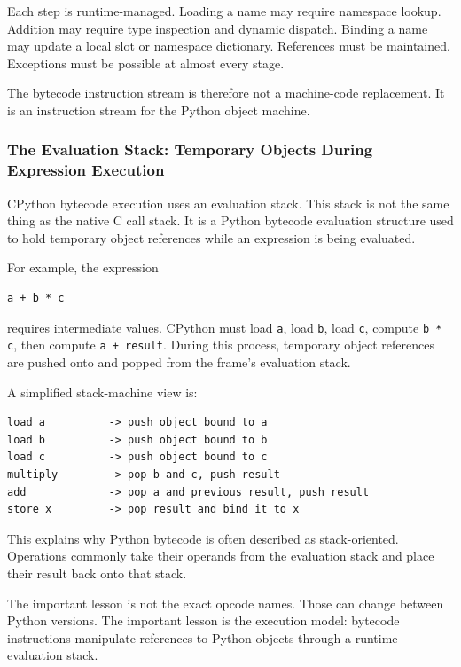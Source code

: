 Each step is runtime-managed. Loading a name may require namespace lookup. Addition may require type inspection and dynamic dispatch. Binding a name may update a local slot or namespace dictionary. References must be maintained. Exceptions must be possible at almost every stage.

The bytecode instruction stream is therefore not a machine-code replacement. It is an instruction stream for the Python object machine.

\subsubsection{The Evaluation Stack: Temporary Objects During Expression Execution}

CPython bytecode execution uses an evaluation stack. This stack is not the same thing as the native C call stack. It is a Python bytecode evaluation structure used to hold temporary object references while an expression is being evaluated.

For example, the expression

\begin{verbatim}
a + b * c
\end{verbatim}

requires intermediate values. CPython must load \texttt{a}, load \texttt{b}, load \texttt{c}, compute \texttt{b * c}, then compute \texttt{a + result}. During this process, temporary object references are pushed onto and popped from the frame's evaluation stack.

A simplified stack-machine view is:

\begin{verbatim}
load a          -> push object bound to a
load b          -> push object bound to b
load c          -> push object bound to c
multiply        -> pop b and c, push result
add             -> pop a and previous result, push result
store x         -> pop result and bind it to x
\end{verbatim}

This explains why Python bytecode is often described as stack-oriented. Operations commonly take their operands from the evaluation stack and place their result back onto that stack.

The important lesson is not the exact opcode names. Those can change between Python versions. The important lesson is the execution model: bytecode instructions manipulate references to Python objects through a runtime evaluation stack.

